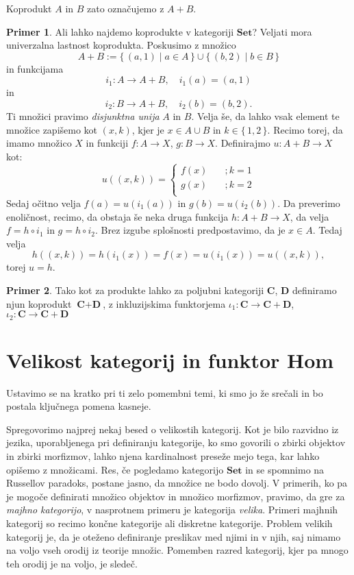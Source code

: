 \documentclass[12pt,a4paper]{book}
\theoremstyle{definition}
\theoremstyle{plain}
\theoremstyle{definition}
\newtheorem{primer}{Primer}[section]
\theoremstyle{remark}
\newcommand{\cat}[1]{\textbf{#1}}
\renewcommand{\set}[1]{\{\,#1\,\}}
\begin{document}
Koprodukt $A$ in $B$ zato označujemo z $A + B$.
\begin{primer} \label{konstrukcija koproduktov v Set}
Ali lahko najdemo koprodukte v kategoriji $\cat{Set}$? 
Veljati mora univerzalna lastnost koprodukta.
Poskusimo z množico 
$$A+B := \set{(a,1) \mid a \in A} \cup \set{(b,2) \mid b \in B}$$
in funkcijama 
$$i_1 : A \to A + B, \quad i_1(a) = (a,1)$$ 
in 
$$i_2 : B \to A+B, \quad i_2(b) = (b,2).$$
Ti množici pravimo \emph{disjunktna unija} $A$ in $B$. Velja še, da lahko vsak element te množice zapišemo kot $(x,k)$, kjer je $x \in A \cup B$ in $k \in \set{1,2}$. Recimo torej, da imamo množico $X$ in funkciji $f : A \to X$, $g: B \to X$. Definirajmo $u: A+B \to X$ kot:
\[
u((x,k)) = 
	\begin{cases}
		f(x) &\quad ;k = 1 \\
		g(x) &\quad ;k = 2 \\
	\end{cases}
\]
Sedaj očitno velja $f(a) = u(i_1(a))$ in $g(b) = u(i_2(b))$. Da preverimo enoličnost, recimo, da obstaja še neka druga funkcija $h : A+B \to X$, da velja $f = h \circ i_1$ in $g = h \circ i_2$. Brez izgube splošnosti predpostavimo, da je $x \in A$. Tedaj velja
$$h((x,k)) = h(i_1(x)) = f(x) = u(i_1(x)) = u((x,k)),$$
torej $u = h$.
\end{primer}

\begin{primer}
Tako kot za produkte lahko za poljubni kategoriji $\cat{C}$, $\cat{D}$ definiramo njun koprodukt $\cat{C} + \cat{D}$, z inkluzijskima funktorjema $\iota_1 : \cat{C} \to \cat{C} + \cat{D}$, $\iota_2 : \cat{C} \to \cat{C} + \cat{D}$
\end{primer}

\section[Velikost in Hom funktor]{Velikost kategorij in funktor Hom}
Ustavimo se na kratko pri ti zelo pomembni temi, ki smo jo že srečali in bo postala ključnega pomena kasneje.


Spregovorimo najprej nekaj besed o velikostih kategorij. Kot je bilo razvidno iz jezika, uporabljenega pri definiranju kategorije, ko smo govorili o zbirki objektov in zbirki morfizmov, lahko njena kardinalnost preseže mejo tega, kar lahko opišemo z množicami. Res, če pogledamo kategorijo $\cat{Set}$ in se spomnimo na Russellov paradoks, postane jasno, da množice ne bodo dovolj. V primerih, ko pa je mogoče definirati množico objektov in množico morfizmov, pravimo, da gre za \emph{majhno kategorijo}, v nasprotnem primeru je kategorija \emph{velika}. Primeri majhnih kategorij so recimo končne kategorije ali diskretne kategorije. Problem velikih kategorij je, da je oteženo definiranje preslikav med njimi in v njih, saj nimamo na voljo vseh orodij iz teorije množic. Pomemben razred kategorij, kjer pa mnogo teh orodij je na voljo, je sledeč.
\end{document}
